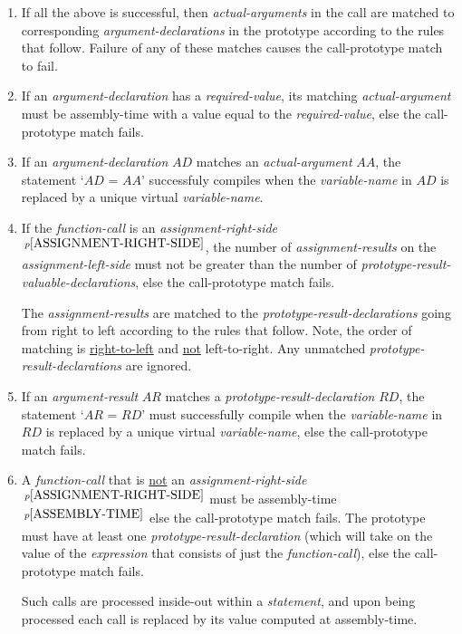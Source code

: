 \documentclass[12pt]{article}
\newcommand{\pagnote}[1]{$\,^{p\pageref{#1}}$}
\begin{document}
\begin{enumerate}
\item If all the above is successful, then {\em actual-arguments}
in the call are matched to corresponding {\em argument-declarations}
in the prototype according to the rules that follow.
Failure of any of these matches causes
the call-prototype match to fail.

\item If an {\em argument-declaration} has a {\em required-value},
its matching {\em actual-argument} must be assembly-time with
a value equal to the {\em required-value}, else the call-prototype
match fails.

\item If an {\em argument-declaration} $AD$ matches an {\em actual-argument}
$AA$, the statement `$AD$ = $AA$' successfuly compiles
when the {\em variable-name} in $AD$ is replaced by a unique virtual
{\em variable-name}.

\item If the {\em function-call} is an
{\em assignment-right-side}\pagnote{ASSIGNMENT-RIGHT-SIDE},
the number of {\em assignment-results} on the
{\em assignment-left-side} must not be greater than the number of
{\em prototype-result-valuable-declarations}, else the call-prototype
match fails.

The {\em assignment-results} are matched to the
{\em prototype-result-declarations} going from right to
left according to the rules that follow.  Note, the order
of matching is \underline{right-to-left} and \underline{not} left-to-right.
Any unmatched {\em prototype-result-declarations}
are ignored.  

\item If an {\em argument-result} $AR$ matches a
{\em prototype-result-declaration} $RD$, the statement `$AR$ = $RD$'
must successfully compile
when the {\em variable-name} in $RD$ is replaced by a unique virtual
{\em variable-name}, else the call-prototype match fails.

\item A {\em function-call} that is \underline{not} an
{\em assignment-right-side}\pagnote{ASSIGNMENT-RIGHT-SIDE}
must be assembly-time\pagnote{ASSEMBLY-TIME} else the
call-prototype match fails.
The prototype must
have at least one {\em prototype-result-declaration} (which
will take on the value of the {\em expression} that consists of
just the {\em function-call}), else the
call-prototype match fails.

Such calls are processed inside-out within a {\em statement},
and upon being processed each call is replaced by its value computed
at assembly-time.

\end{enumerate}
\end{document}
